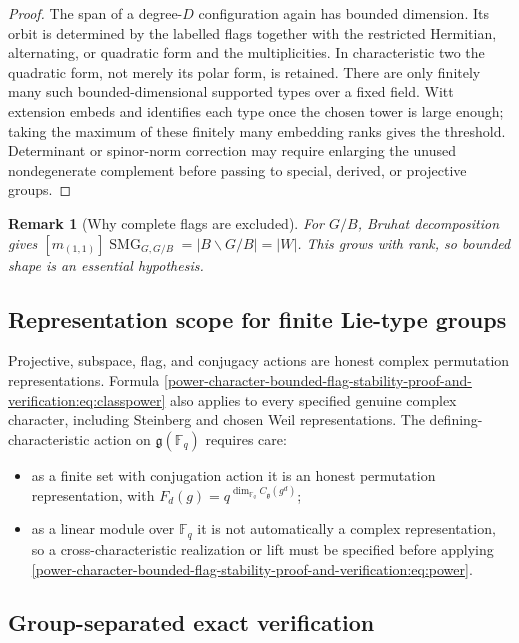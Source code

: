 \documentclass[10pt]{article}
\newcommand{\SMG}{\operatorname{SMG}}
\newcommand{\MGF}{\SMG}
\newcommand{\F}{\mathbb F}
\newtheorem{remark}{Remark}
\begin{document}
\begin{proof}
The span of a degree-$D$ configuration again has bounded dimension.  Its orbit
is determined by the labelled flags together with the restricted Hermitian,
alternating, or quadratic form and the multiplicities.  In characteristic two
the quadratic form, not merely its polar form, is retained.  There are only
finitely many such bounded-dimensional supported types over a fixed field.
Witt extension embeds and identifies each type once the chosen tower is large
enough; taking the maximum of these finitely many embedding ranks gives the
threshold.  Determinant or spinor-norm correction may require enlarging the
unused nondegenerate complement before passing to special, derived, or
projective groups.
\end{proof}

\begin{remark}[Why complete flags are excluded]
For $G/B$, Bruhat decomposition gives
$[m_{(1,1)}]\MGF_{G,G/B}=|B\backslash G/B|=|W|$.  This grows with rank, so
bounded shape is an essential hypothesis.
\end{remark}

\subsection{Representation scope for finite Lie-type groups}

Projective, subspace, flag, and conjugacy actions are honest complex
permutation representations.  Formula \eqref{power-character-bounded-flag-stability-proof-and-verification:eq:classpower} also applies to
every specified genuine complex character, including Steinberg and chosen
Weil representations.  The defining-characteristic action on
$\mathfrak g(\F_q)$ requires care:
\begin{itemize}
\item as a finite set with conjugation action it is an honest permutation
representation, with
$F_d(g)=q^{\dim_{\F_q}C_{\mathfrak g}(g^d)}$;
\item as a linear module over $\F_q$ it is not automatically a complex
representation, so a cross-characteristic realization or lift must be
specified before applying \eqref{power-character-bounded-flag-stability-proof-and-verification:eq:power}.
\end{itemize}

\subsection{Group-separated exact verification}
\end{document}
